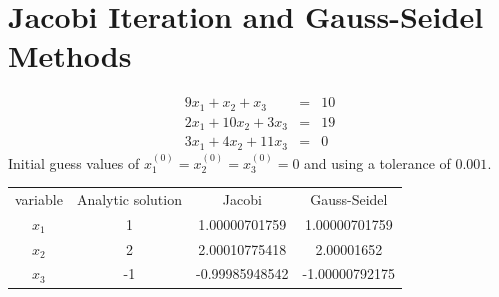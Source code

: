 \documentclass[12,a4paper]{article}
\begin{document}
    \section{Jacobi Iteration and Gauss-Seidel Methods}
    \begin{eqnarray*}
        9x_1 + x_2 + x_3 &=& 10 \\
        2x_1 + 10x_2 + 3x_3 &=& 19 \\
        3x_1 + 4x_2 + 11x_3 &=& 0
    \end{eqnarray*}
    Initial guess values of $x^{(0)}_1 = x^{(0)}_2 = x^{(0)}_3 = 0$ and using a tolerance of $0.001$.
    \begin{table}[H]
        \centering
        \begin{tabular}{|c|c|c|c|}
            \hline
            variable & Analytic solution & Jacobi & Gauss-Seidel \\
            $x_1$ & 1 & 1.00000701759 & 1.00000701759 \\
            $x_2$ & 2 & 2.00010775418 & 2.00001652  \\
            $x_3$ & -1 & -0.99985948542 & -1.00000792175 \\
            \hline 
        \end{tabular}
    \end{table}
\end{document}
